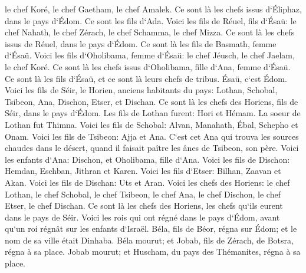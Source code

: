 \verse le chef Koré, le chef Gaetham, le chef Amalek. Ce sont là les chefs issus d`Éliphaz, dans le pays d`Édom. Ce sont les fils d`Ada. 
\verse Voici les fils de Réuel, fils d`Ésaü: le chef Nahath, le chef Zérach, le chef Schamma, le chef Mizza. Ce sont là les chefs issus de Réuel, dans le pays d`Édom. Ce sont là les fils de Basmath, femme d`Ésaü. 
\verse Voici les fils d`Oholibama, femme d`Ésaü: le chef Jéusch, le chef Jaelam, le chef Koré. Ce sont là les chefs issus d`Oholibama, fille d`Ana, femme d`Ésaü. 
\verse Ce sont là les fils d`Ésaü, et ce sont là leurs chefs de tribus. Ésaü, c`est Édom. 
\verse Voici les fils de Séir, le Horien, anciens habitants du pays: Lothan, Schobal, Tsibeon, Ana, 
\verse Dischon, Etser, et Dischan. Ce sont là les chefs des Horiens, fils de Séir, dans le pays d`Édom. 
\verse Les fils de Lothan furent: Hori et Hémam. La soeur de Lothan fut Thimna. 
\verse Voici les fils de Schobal: Alvan, Manahath, Ébal, Schepho et Onam. 
\verse Voici les fils de Tsibeon: Ajja et Ana. C`est cet Ana qui trouva les sources chaudes dans le désert, quand il faisait paître les ânes de Tsibeon, son père. 
\verse Voici les enfants d`Ana: Dischon, et Oholibama, fille d`Ana. 
\verse Voici les fils de Dischon: Hemdan, Eschban, Jithran et Karen. 
\verse Voici les fils d`Etser: Bilhan, Zaavan et Akan. 
\verse Voici les fils de Dischan: Uts et Aran. 
\verse Voici les chefs des Horiens: le chef Lothan, le chef Schobal, le chef Tsibeon, le chef Ana, 
\verse le chef Dischon, le chef Etser, le chef Dischan. Ce sont là les chefs des Horiens, les chefs qu`ils eurent dans le pays de Séir. 
\verse Voici les rois qui ont régné dans le pays d`Édom, avant qu`un roi régnât sur les enfants d`Israël. 
\verse Béla, fils de Béor, régna sur Édom; et le nom de sa ville était Dinhaba. 
\verse Béla mourut; et Jobab, fils de Zérach, de Botsra, régna à sa place. 
\verse Jobab mourut; et Huscham, du pays des Thémanites, régna à sa place. 
